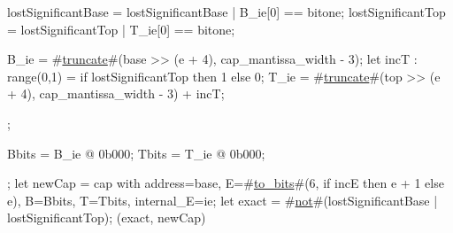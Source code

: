 {{{      lostSignificantBase = lostSignificantBase | B_ie[0] == bitone;
      lostSignificantTop  = lostSignificantTop | T_ie[0] == bitone;

      B_ie = #\hyperref[sailRISCVztruncate]{truncate}#(base >> (e + 4), cap_mantissa_width - 3);
      let incT : range(0,1) = if lostSignificantTop then 1 else 0;
      T_ie = #\hyperref[sailRISCVztruncate]{truncate}#(top >> (e + 4), cap_mantissa_width - 3) + incT;
    };

    Bbits = B_ie @ 0b000;
    Tbits = T_ie @ 0b000;
  };
  let newCap = {cap with address=base, E=#\hyperref[sailRISCVztozybits]{to\_bits}#(6, if incE then e + 1 else e), B=Bbits, T=Tbits, internal_E=ie};
  let exact = #\hyperref[sailRISCVznot]{not}#(lostSignificantBase | lostSignificantTop);
  (exact, newCap)
}
